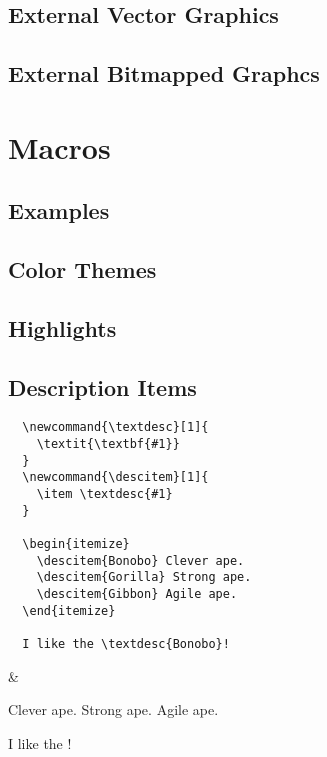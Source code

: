 \subsection{External Vector Graphics}
\subsection{External Bitmapped Graphcs}

\section{Macros}


\subsection{Examples}

\subsection{Color Themes}
\subsection{Highlights}
\subsection{Description Items}

\begin{latexdemo}
  \begin{verbatim}
  \newcommand{\textdesc}[1]{
    \textit{\textbf{#1}}
  }
  \newcommand{\descitem}[1]{
    \item \textdesc{#1}
  }
  
  \begin{itemize}
    \descitem{Bonobo} Clever ape.
    \descitem{Gorilla} Strong ape.
    \descitem{Gibbon} Agile ape.
  \end{itemize}
  
  I like the \textdesc{Bonobo}!
  \end{verbatim}
  &
  \begin{itemize}
     Clever ape.
     Strong ape.
     Agile ape.
  \end{itemize}
  
  I like the !
\end{latexdemo}

